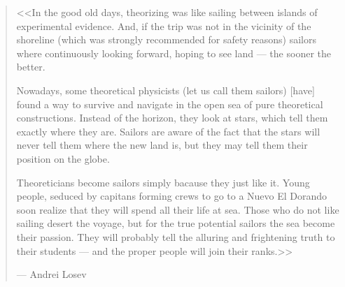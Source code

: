 
\cleardoublepage
\thispagestyle{empty}
{}

\vspace*{3cm}

\begin{quotation}

   <<In the good old days, theorizing was like sailing between islands of
   experimental evidence. And, if the trip was not in the vicinity of the
   shoreline (which was strongly recommended for safety reasons) sailors where
   continuously looking forward, hoping to see land --- the sooner the better.
   
   Nowadays, some theoretical physicists (let us call them sailors) [have]
   found a way to survive and navigate in the open sea of pure theoretical
   constructions. Instead of the horizon, they look at stars, which tell them
   exactly where they are. Sailors are aware of the fact that the stars will
   never tell them where the new land is, but they may tell them their position
   on the globe. 

   Theoreticians become sailors simply bacause they just like it. Young people,
   seduced by capitans forming crews to go to a Nuevo El Dorando \omissis{} soon
   realize that they will spend all their life at sea. Those who do not like
   sailing desert the voyage, but for the true potential sailors the sea become
   their passion. They will probably tell the alluring and frightening truth to
   their students --- and the proper people will join their ranks.>>

   \begin{flushright}
      ---  Andrei Losev
   \end{flushright}

\end{quotation}

\medskip











